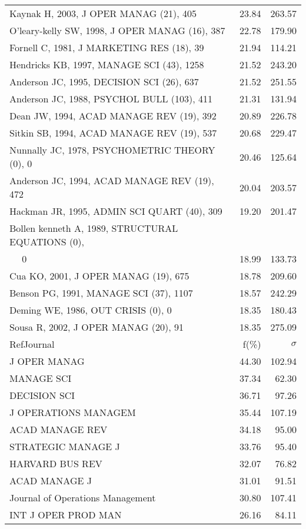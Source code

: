 \documentclass[a4paper,11pt]{report}
\begin{document}
\begin{landscape}
\begin{table}[!ht]
{\begin{tabular}{|l r r|}
Kaynak H, 2003, J OPER MANAG (21), 405 & 23.84 & 263.57\\
O'leary-kelly SW, 1998, J OPER MANAG (16), 387 & 22.78 & 179.90\\
Fornell C, 1981, J MARKETING RES (18), 39 & 21.94 & 114.21\\
Hendricks KB, 1997, MANAGE SCI (43), 1258 & 21.52 & 243.20\\
Anderson JC, 1995, DECISION SCI (26), 637 & 21.52 & 251.55\\
Anderson JC, 1988, PSYCHOL BULL (103), 411 & 21.31 & 131.94\\
Dean JW, 1994, ACAD MANAGE REV (19), 392 & 20.89 & 226.78\\
Sitkin SB, 1994, ACAD MANAGE REV (19), 537 & 20.68 & 229.47\\
Nunnally JC, 1978, PSYCHOMETRIC THEORY (0), 0 & 20.46 & 125.64\\
Anderson JC, 1994, ACAD MANAGE REV (19), 472 & 20.04 & 203.57\\
Hackman JR, 1995, ADMIN SCI QUART (40), 309 & 19.20 & 201.47\\
Bollen kenneth A, 1989, STRUCTURAL EQUATIONS (0), &  & \\
$\quad$ 0 & 18.99 & 133.73\\
Cua KO, 2001, J OPER MANAG (19), 675 & 18.78 & 209.60\\
Benson PG, 1991, MANAGE SCI (37), 1107 & 18.57 & 242.29\\
Deming WE, 1986, OUT CRISIS (0), 0 & 18.35 & 180.43\\
Sousa R, 2002, J OPER MANAG (20), 91 & 18.35 & 275.09\\
\hline
\hline
RefJournal & f(\%) & $\sigma$\\
\hline
J OPER MANAG & 44.30 & 102.94\\
MANAGE SCI & 37.34 & 62.30\\
DECISION SCI & 36.71 & 97.26\\
J OPERATIONS MANAGEM & 35.44 & 107.19\\
ACAD MANAGE REV & 34.18 & 95.00\\
STRATEGIC MANAGE J & 33.76 & 95.40\\
HARVARD BUS REV & 32.07 & 76.82\\
ACAD MANAGE J & 31.01 & 91.51\\
Journal of Operations Management & 30.80 & 107.41\\
INT J OPER PROD MAN & 26.16 & 84.11\\
\hline
\end{tabular}
}
\end{table}


\end{landscape}
\end{document}
